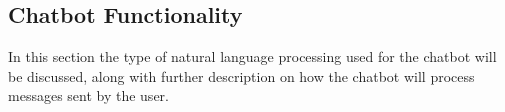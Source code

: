 \subsection{Chatbot Functionality}

In this section the type of natural language processing used for the chatbot will be discussed, along with further description on how the chatbot will process messages sent by the user. 